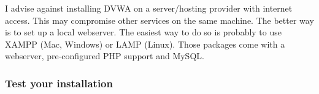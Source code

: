 \documentclass{report}
\begin{document}
I advise against installing \textsc{DVWA} on a server/hosting provider with 
internet access. This may compromise other services on the same machine.
The better way is to set up a local webserver. The easiest way to do so
is probably to use XAMPP (Mac, Windows) or LAMP (Linux). Those packages
come with a webserver, pre-configured PHP support and MySQL.

\subsubsection{Test your installation}
\end{document}
